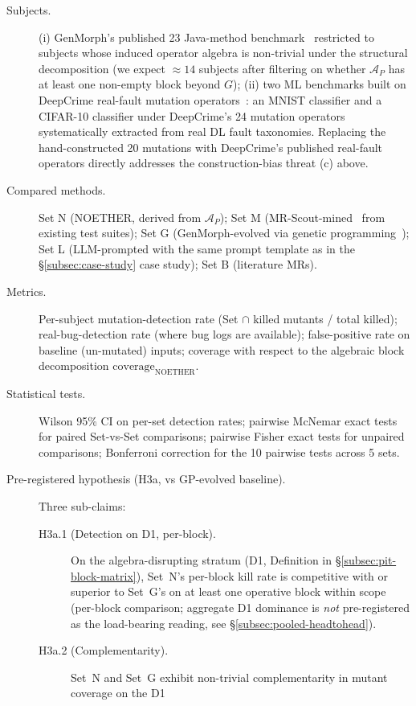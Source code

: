 \documentclass[manuscript]{acmart}
\begin{document}
\begin{description}
  \item[Subjects.] (i) GenMorph's published 23 Java-method benchmark~\cite{GenMorph2024} restricted to subjects whose induced operator algebra is non-trivial under the structural decomposition (we expect $\approx 14$ subjects after filtering on whether $\mathcal{A}_P$ has at least one non-empty block beyond $G$); (ii) two ML benchmarks built on DeepCrime real-fault mutation operators~\cite{Humbatova2021DeepCrime}: an MNIST classifier and a CIFAR-10 classifier under DeepCrime's 24 mutation operators systematically extracted from real DL fault taxonomies. Replacing the hand-constructed 20 mutations with DeepCrime's published real-fault operators directly addresses the construction-bias threat (c) above.
  \item[Compared methods.] Set N (NOETHER, derived from $\mathcal{A}_P$); Set M (MR-Scout-mined~\cite{MRScout2024} from existing test suites); Set G (GenMorph-evolved via genetic programming~\cite{GenMorph2024}); Set L (LLM-prompted with the same prompt template as in the §\ref{subsec:case-study} case study); Set B (literature MRs).
  \item[Metrics.] Per-subject mutation-detection rate (Set $\cap$ killed mutants / total killed); real-bug-detection rate (where bug logs are available); false-positive rate on baseline (un-mutated) inputs; coverage with respect to the algebraic block decomposition $\mathrm{coverage}_{\mathrm{NOETHER}}$.
  \item[Statistical tests.] Wilson 95\% CI on per-set detection rates; pairwise McNemar exact tests for paired Set-vs-Set comparisons; pairwise Fisher exact tests for unpaired comparisons; Bonferroni correction for the 10 pairwise tests across 5 sets.
  \item[Pre-registered hypothesis (H3a, vs GP-evolved baseline).]
  Three sub-claims:
  \begin{description}
    \item[H3a.1 (Detection on D1, per-block).] On the
      algebra-disrupting stratum (D1, Definition in
      \S\ref{subsec:pit-block-matrix}), Set~N's per-block kill rate
      is competitive with or superior to Set~G's on at least one
      operative block within scope (per-block comparison; aggregate
      D1 dominance is \emph{not} pre-registered as the load-bearing
      reading, see \S\ref{subsec:pooled-headtohead}).
    \item[H3a.2 (Complementarity).] Set~N and Set~G exhibit
      non-trivial complementarity in mutant coverage on the D1

\end{description}
\end{description}
\end{document}
